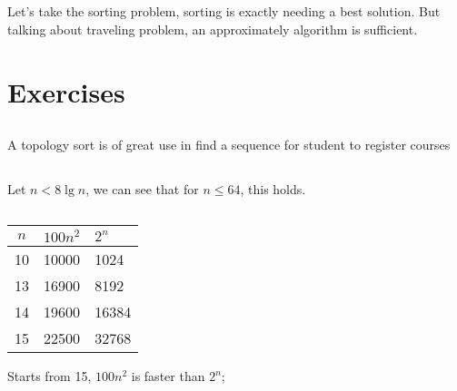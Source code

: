 \documentclass[paper=a4, fontsize=11pt,oneside]{book} %
\numberwithin{equation}{section} %
\numberwithin{figure}{section} %
\numberwithin{table}{section} %
\begin{document}
		\subsection{}
		Let's take the sorting problem, sorting is exactly needing a best solution. But talking about traveling problem, an approximately algorithm is sufficient.
	\section{Exercises}
		\subsection{}
		A topology sort is of great use in find a sequence for student to register courses
		\subsection{}
		Let $n < 8\lg n $, we can see that for $ n \leq 64$, this holds.
		\subsection{}
		\begin{center}
		\begin{tabular}{c|p{5cm}| p{5cm}}
			\hline
			$ n $ & $ 100n^2$ & $ 2^n$ \\ \hline
			10 & 10000 & 1024 \\ \hline
			13 & 16900 & 8192 \\ \hline
			14 & 19600 & 16384 \\ \hline
			15 & 22500 & 32768\\
			
		\end{tabular} 
		\end{center}
		Starts from 15, $100n^2 $ is faster than $2^n$;
\end{document}

